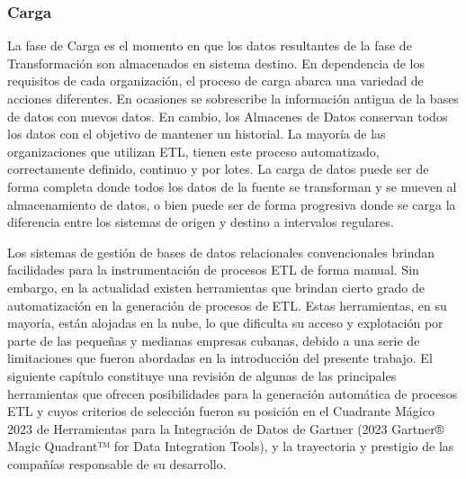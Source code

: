 \subsubsection{Carga}

La fase de Carga es el momento en que los datos resultantes de la fase de Transformaci\'on son almacenados en sistema destino. 
En dependencia de los requisitos de cada organización, el proceso de carga abarca una variedad de acciones diferentes. 
En ocasiones se sobrescribe la información antigua de la bases de datos con nuevos datos. En cambio, los Almacenes de Datos 
conservan todos los datos con el objetivo de mantener un historial. La mayoría de las organizaciones que utilizan ETL, 
tienen este proceso automatizado, correctamente definido, continuo y por lotes\cite{ETL_amazon}. La carga de datos puede
ser de forma completa donde todos los datos de la fuente se transforman y se mueven al almacenamiento de datos, o bien 
puede ser de forma progresiva donde se carga la diferencia entre los sistemas de origen y destino a intervalos regulares.

Los sistemas de gesti\'on de bases de datos relacionales convencionales brindan facilidades para la instrumentaci\'on 
de procesos ETL de forma manual. Sin embargo, en la actualidad existen herramientas que brindan cierto grado de 
automatizaci\'on en la generación de procesos de ETL. Estas herramientas, en su mayoría, est\'an alojadas en la 
nube, lo que dificulta su acceso y explotaci\'on por parte de las pequeñas y medianas empresas cubanas, debido 
a una serie de limitaciones que fueron abordadas en la introducci\'on del presente trabajo. El siguiente 
cap\'itulo constituye una revisi\'on de algunas de las principales herramientas que ofrecen posibilidades 
para la generación autom\'atica de procesos ETL y cuyos criterios de selecci\'on fueron su posici\'on en el 
Cuadrante M\'agico 2023 de Herramientas para la Integración de Datos de 
Gartner (2023 Gartner® Magic Quadrant™ for Data Integration Tools)\cite{magic_q}, y la trayectoria y prestigio 
de las compañ\'ias responsable de su desarrollo.